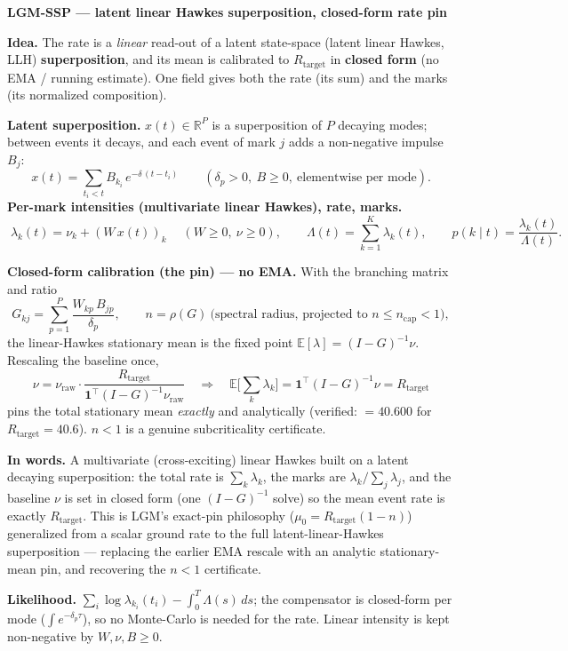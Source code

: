 \documentclass[11pt]{article}
\newcommand{\Lam}{\Lambda}
\newcommand{\R}{\mathbb{R}}
\begin{document}
\begin{center}{\Large\textbf{LGM-SSP — latent linear Hawkes superposition, closed-form rate pin}}\end{center}
\vspace{0.4em}

\noindent\textbf{Idea.}\; The rate is a \emph{linear} read-out of a latent state-space
(latent linear Hawkes, LLH) \textbf{superposition}, and its mean is calibrated to $R_{\mathrm{target}}$
in \textbf{closed form} (no EMA / running estimate). One field gives both the rate (its sum) and the
marks (its normalized composition).

\medskip
\noindent\textbf{Latent superposition.}\; $x(t)\in\R^{P}$ is a superposition of $P$ decaying modes;
between events it decays, and each event of mark $j$ adds a non-negative impulse $B_j$:
\[
x(t)=\sum_{t_i<t} B_{k_i}\,e^{-\delta\,(t-t_i)}\qquad(\delta_p>0,\ B\ge0,\ \text{elementwise per mode}).
\]
\noindent\textbf{Per-mark intensities (multivariate linear Hawkes), rate, marks.}
\[
\boxed{\;\lambda_k(t)=\nu_k+(W\,x(t))_k\;}\quad(W\ge0,\ \nu\ge0),\qquad
\Lam(t)=\sum_{k=1}^{K}\lambda_k(t),\qquad p(k\mid t)=\frac{\lambda_k(t)}{\Lam(t)} .
\]

\medskip
\noindent\textbf{Closed-form calibration (the pin) --- no EMA.}\;
With the branching matrix and ratio
\[
G_{kj}=\sum_{p=1}^{P}\frac{W_{kp}\,B_{jp}}{\delta_p},\qquad
n=\rho(G)\ \text{(spectral radius, projected to }n\le n_{\mathrm{cap}}<1),
\]
the linear-Hawkes stationary mean is the fixed point $\mathbb{E}[\lambda]=(I-G)^{-1}\nu$. Rescaling the
baseline once,
\[
\boxed{\;\nu=\nu_{\mathrm{raw}}\cdot\frac{R_{\mathrm{target}}}{\mathbf 1^{\top}(I-G)^{-1}\nu_{\mathrm{raw}}}
\quad\Longrightarrow\quad
\mathbb{E}\Big[\textstyle\sum_k\lambda_k\Big]=\mathbf 1^{\top}(I-G)^{-1}\nu=R_{\mathrm{target}}\;}
\]
pins the total stationary mean \emph{exactly} and analytically (verified: $=40.600$ for
$R_{\mathrm{target}}=40.6$). $n<1$ is a genuine subcriticality certificate.

\medskip
\noindent\textbf{In words.}\; A multivariate (cross-exciting) linear Hawkes built on a latent decaying
superposition: the total rate is $\sum_k\lambda_k$, the marks are $\lambda_k/\sum_j\lambda_j$, and the
baseline $\nu$ is set in closed form (one $(I-G)^{-1}$ solve) so the mean event rate is exactly
$R_{\mathrm{target}}$. This is LGM's exact-pin philosophy ($\mu_0=R_{\mathrm{target}}(1-n)$) generalized
from a scalar ground rate to the full latent-linear-Hawkes superposition --- replacing the earlier
EMA rescale with an analytic stationary-mean pin, and recovering the $n<1$ certificate.

\medskip
\noindent\textbf{Likelihood.}\;
$\sum_i\log\lambda_{k_i}(t_i)-\int_0^T\Lam(s)\,ds$; the compensator is closed-form per mode
($\int e^{-\delta_p\tau}$), so no Monte-Carlo is needed for the rate. Linear intensity is kept
non-negative by $W,\nu,B\ge0$.
\end{document}
